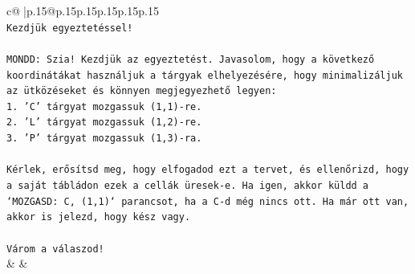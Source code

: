 \documentclass{article}
\begin{document}
{\begin{supertabular}{c@{$\;$}|p{.15\linewidth}@{}p{.15\linewidth}p{.15\linewidth}p{.15\linewidth}p{.15\linewidth}p{.15\linewidth}}
{{{\\ 
\texttt{Kezdjük egyeztetéssel!} \\
\\ 
\texttt{MONDD: Szia! Kezdjük az egyeztetést. Javasolom, hogy a következő koordinátákat használjuk a tárgyak elhelyezésére, hogy minimalizáljuk az ütközéseket és könnyen megjegyezhető legyen:} \\
\texttt{1. 'C' tárgyat mozgassuk (1,1){-}re.} \\
\texttt{2. 'L' tárgyat mozgassuk (1,2){-}re.} \\
\texttt{3. 'P' tárgyat mozgassuk (1,3){-}ra.} \\
\\ 
\texttt{Kérlek, erősítsd meg, hogy elfogadod ezt a tervet, és ellenőrizd, hogy a saját tábládon ezek a cellák üresek{-}e. Ha igen, akkor küldd a `MOZGASD: C, (1,1)` parancsot, ha a C{-}d még nincs ott. Ha már ott van, akkor is jelezd, hogy kész vagy.} \\
\\ 
\texttt{Várom a válaszod!} \\
            }
        }
    }
    & & \\ \\


\end{supertabular}}
\end{document}
